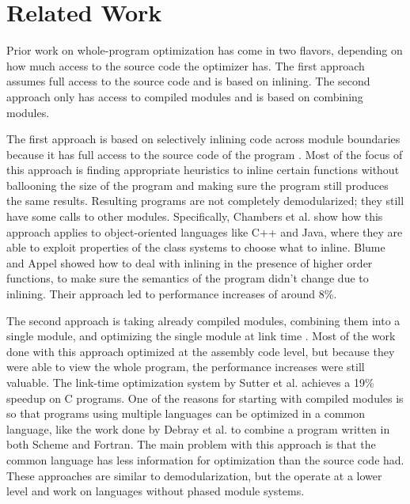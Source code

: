 \chapter{Related Work}
\label{chap:related-work}
Prior work on whole-program optimization has come in two flavors, depending on how much access to the source code the optimizer has. The first approach assumes full access to the source code and is based on inlining. The second approach only has access to compiled modules and is based on combining modules.

The first approach is based on selectively inlining code across module boundaries because it has full access to the source code of the program \cite{258960,Chambers96whole-programoptimization}. Most of the focus of this approach is finding appropriate heuristics to inline certain functions without ballooning the size of the program and making sure the program still produces the same results. Resulting programs are not completely demodularized; they still have some calls to other modules. Specifically, Chambers et al. \cite{Chambers96whole-programoptimization} show how this approach applies to object-oriented languages like C++ and Java, where they are able to exploit properties of the class systems to choose what to inline. Blume and Appel \cite{258960} showed how to deal with inlining in the presence of higher order functions, to make sure the semantics of the program didn't change due to inlining. Their approach led to performance increases of around 8\%.

The second approach is taking already compiled modules, combining them into a single module, and optimizing the single module at link time \cite{sutter,727617}. Most of the work done with this approach optimized at the assembly code level, but because they were able to view the whole program, the performance increases were still valuable. 
The link-time optimization system by Sutter et al. \cite{sutter} achieves a 19\% speedup on C programs.
One of the reasons for starting with compiled modules is so that programs using multiple languages can be optimized in a common language, like the work done by Debray et al. \cite{727617} to combine a program written in both Scheme and Fortran. The main problem with this approach is that the common language has less information for optimization than the source code had. 
These approaches are similar to demodularization, but the operate at a lower level and work on languages without phased module systems.

